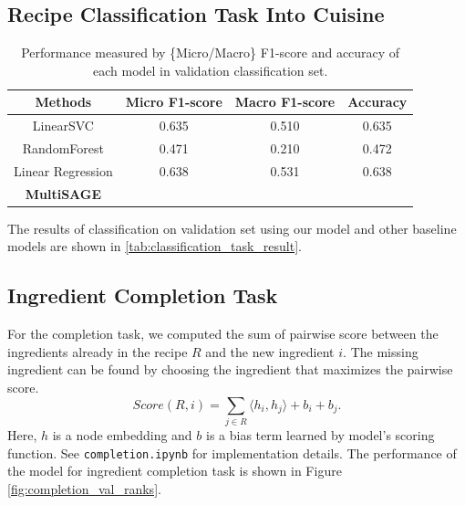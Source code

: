  \subsection{Recipe Classification Task Into Cuisine}
 
 \begin{table}[btp!]
    \centering
    \begin{tabular}{ c c c c }
        \toprule
        \textbf{Methods} & \textbf{Micro F1-score} & \textbf{Macro F1-score} & \textbf{Accuracy} \\
        \midrule
        LinearSVC & 0.635 & 0.510 & 0.635 \\
        RandomForest & 0.471 & 0.210 & 0.472 \\
        Linear Regression & 0.638 & 0.531 & 0.638 \\
        \textbf{MultiSAGE} & & & \\
        \bottomrule
        
    \end{tabular}
    \caption{\label{tab:classification_task_result} Performance measured by \{Micro/Macro\} F1-score and accuracy of each model in validation classification set.}

 \end{table}
 
  The results of classification on validation set using our model and other baseline models are shown in \autoref{tab:classification_task_result}.  
  
 \subsection{Ingredient Completion Task}
 For the completion task, we computed the sum of pairwise score between the ingredients already in the recipe $R$ and the new ingredient $i$. The missing ingredient can be found by choosing the ingredient that maximizes the pairwise score.
 \begin{equation}
     Score(R, i) = \sum_{j \in R} \langle h_i, h_j \rangle + b_i + b_j.
 \end{equation}
 Here, $h$ is a node embedding and $b$ is a bias term learned by model's scoring function. See \texttt{completion.ipynb} for implementation details. The performance of the model for ingredient completion task is shown in Figure \autoref{fig:completion_val_ranks}.

